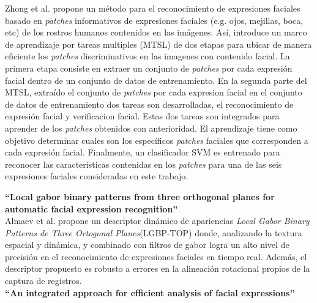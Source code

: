 Zhong et al. propone un método para el reconocimiento de expresiones faciales basado en \textit{patches} informativos de expresiones faciales (e.g. ojos, mejillas, boca, etc) de los rostros humanos contenidos en las imágenes. Así, introduce un marco de aprendizaje por tareas multiples (MTSL) de dos etapas para ubicar de manera eficiente los \textit{patches} discriminativos en las imagenes con contenido facial. La primera etapa consiste en extraer un conjunto de \textit{patches} por cada expresión facial dentro de un conjunto de datos de entrenamiento. En la segunda parte del MTSL, extraído el conjunto  de \textit{patches} por cada expresion facial en el conjunto de datos de entrenamiento dos tareas son desarrolladas, el reconocimiento de expresión facial y verificacion facial.  Estas dos tareas son integrados para aprender de los \textit{patches} obtenidos con anterioridad. El aprendizaje tiene como objetivo determinar cuales son los específicos \textit{patches} faciales que corresponden a cada expresión facial. Finalmente, un clasificador SVM es entrenado para reconocer las características contenidas en los \textit{patches} para una de las seis expresiones faciales consideradas en este trabajo. 
\vspace{2cm}

\textbf{“Local gabor binary patterns from three orthogonal planes for automatic facial expression recognition” \cite{almaev2013local}}\\ 

Almaev et al.  propone un descriptor dinámico de apariencias \textit{Local Gabor Binary Patterns de Three Ortogonal Planes}(LGBP-TOP) donde, analizando la textura espacial y dinámica, y combinado con filtros de gabor logra un alto nivel de precisión en el reconocimiento de expresiones faciales en tiempo real. Además, el descriptor propuesto es robusto a errores en la alineación rotacional propios de la captura de registros.
\\

\textbf{“An integrated approach for efficient analysis of facial expressions” \cite{ghayoumi2014integrated}}\\

